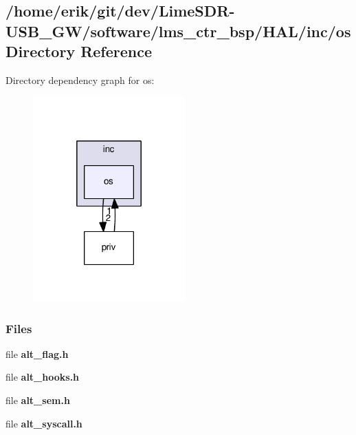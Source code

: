 \subsection{/home/erik/git/dev/\+Lime\+S\+D\+R-\/\+U\+S\+B\+\_\+\+G\+W/software/lms\+\_\+ctr\+\_\+bsp/\+H\+A\+L/inc/os Directory Reference}
\label{dir_fcc3403013f7485f7eb46539fd0a94d8}
Directory dependency graph for os\+:
\nopagebreak
\begin{figure}[H]
\begin{center}
\leavevmode
\includegraphics[width=166pt]{dir_fcc3403013f7485f7eb46539fd0a94d8_dep}
\end{center}
\end{figure}
\subsubsection*{Files}
\begin{DoxyCompactItemize}
\item 
file {\bf alt\+\_\+flag.\+h}
\item 
file {\bf alt\+\_\+hooks.\+h}
\item 
file {\bf alt\+\_\+sem.\+h}
\item 
file {\bf alt\+\_\+syscall.\+h}
\end{DoxyCompactItemize}

